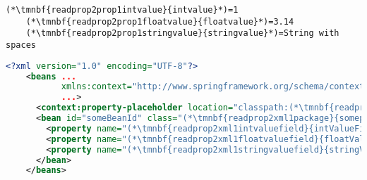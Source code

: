 \newpage

\enlargethispage{20mm}
\thispagestyle{empty}
\begin{lstlisting}[title={A \textit{properties} file called \tmnbf{readprop2prop1filename}{\textit{setters.properties}}}]
    (*\tmnbf{readprop2prop1intvalue}{intvalue}*)=1
    (*\tmnbf{readprop2prop1floatvalue}{floatvalue}*)=3.14
    (*\tmnbf{readprop2prop1stringvalue}{stringvalue}*)=String with spaces
\end{lstlisting}
\begin{lstlisting}[language=XML, title={Configuration XML}]
    <?xml version="1.0" encoding="UTF-8"?>
    <beans ...
           xmlns:context="http://www.springframework.org/schema/context"
           ...>
      <context:property-placeholder location="classpath:(*\tmnbf{readprop2xml1filename}{setter.properties}[ForestGreen]*)" file-encoding="utf-8"/>
      <bean id="someBeanId" class="(*\tmnbf{readprop2xml1package}{somepackage.subpackage}[ForestGreen]*).(*\tmnbf{readprop2xml1class}{WantedClass}[ForestGreen]*)">
        <property name="(*\tmnbf{readprop2xml1intvaluefield}{intValueField}[ForestGreen]*)" value="(*\Sc*){(*\tmnbf{readprop2xml1intvalue}{intvalue}[ForestGreen]*)}"/>
        <property name="(*\tmnbf{readprop2xml1floatvaluefield}{floatValueField}[ForestGreen]*)" value="(*\Sc*){(*\tmnbf{readprop2xml1floatvalue}{floatvalue}[ForestGreen]*)}"/>
        <property name="(*\tmnbf{readprop2xml1stringvaluefield}{stringValueField}[ForestGreen]*)" value="(*\Sc*){(*\tmnbf{readprop2xml1stringvalue}{stringvalue}[ForestGreen]*)}"/>
      </bean>
    </beans>
\end{lstlisting}
